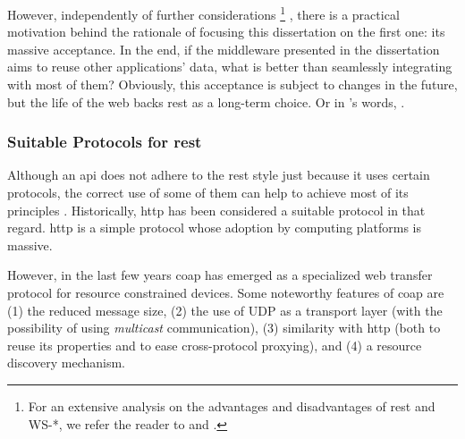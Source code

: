 However, independently of further considerations
\footnote{For an extensive analysis on the advantages and disadvantages of \ac{rest} and WS-*, we refer the reader to \citep{pautasso_restful_2008} and \citep{guinard_search_2011}.}
, there is a practical motivation behind the rationale of focusing this dissertation on the first one: its massive acceptance. %
In the end, if the middleware presented in the dissertation aims to reuse other applications' data, what is better than seamlessly integrating with most of them?
Obviously, this acceptance is subject to changes in the future, but the life of the web backs \ac{rest} as a long-term choice.
Or in \citeauthor{fielding_architectural_2000}'s words,
 \cite[comment 21]{fielding_rest_2008}.



\subsubsection{Suitable Protocols for \ac{rest}}
\label{sec:protocols}

Although an \ac{api} does not adhere to the \ac{rest} style just because it uses certain protocols,
the correct use of some of them can help to achieve most of its principles \citep{moore_hypermedia_2010}.
Historically, \acf{http} has been considered a suitable protocol in that regard.
\ac{http} is a simple protocol whose adoption by computing platforms is massive.


However, in the last few years \acf{coap} has emerged as a specialized web transfer protocol for resource constrained devices. %
Some noteworthy features of \ac{coap} are
(1) the reduced message size,
(2) the use of UDP as a transport layer (with the possibility of using \emph{multicast} communication),
(3) similarity with \ac{http} (both to reuse its properties and to ease cross-protocol proxying), and
(4) a resource discovery mechanism. %


